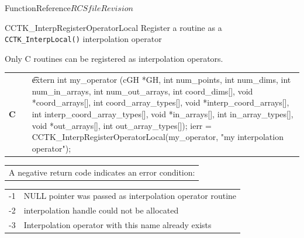 \begin{cactuspart}{FunctionReference}{$RCSfile$}{$Revision$}

\begin{CCTKFunc}{CCTK\_InterpRegisterOperatorLocal}%
{Register a routine as a {\tt CCTK\_InterpLocal()} interpolation operator}
\label{CCTK-InterpRegisterOperatorLocal}
\showcargs
\begin{params}
\end{params}
\begin{discussion}
Only C routines can be registered as interpolation operators.
\end{discussion}
\begin{examples}
\begin{tabular}{@{}p{3cm}cp{11cm}}
\hfill {\bf C} && {\t
extern int my\_operator (cGH *GH,\vfill
\hspace{29ex}int num\_points,\vfill
\hspace{29ex}int num\_dims,\vfill
\hspace{29ex}int num\_in\_arrays,\vfill
\hspace{29ex}int num\_out\_arrays,\vfill
\hspace{29ex}int coord\_dims[],\vfill
\hspace{29ex}void *coord\_arrays[],\vfill
\hspace{29ex}int coord\_array\_types[],\vfill
\hspace{29ex}void *interp\_coord\_arrays[],\vfill
\hspace{29ex}int interp\_coord\_array\_types[],\vfill
\hspace{29ex}void *in\_arrays[],\vfill
\hspace{29ex}int in\_array\_types[],\vfill
\hspace{29ex}void *out\_arrays[],\vfill
\hspace{29ex}int out\_array\_types[]);\linebreak
ierr = CCTK\_InterpRegisterOperatorLocal(my\_operator,\vfill
\hspace{2ex}"my interpolation operator");}
\\
\end{tabular}
\end{examples}
\begin{errorcodes}
\begin{tabular}{l}
A negative return code indicates an error condition:
\end{tabular}
\begin{tabular}{ll}
-1 & NULL pointer was passed as interpolation operator routine\\
-2 & interpolation handle could not be allocated\\
-3 & Interpolation operator with this name already exists\\
\end{tabular}
\end{errorcodes}
\end{CCTKFunc}


\end{cactuspart}
